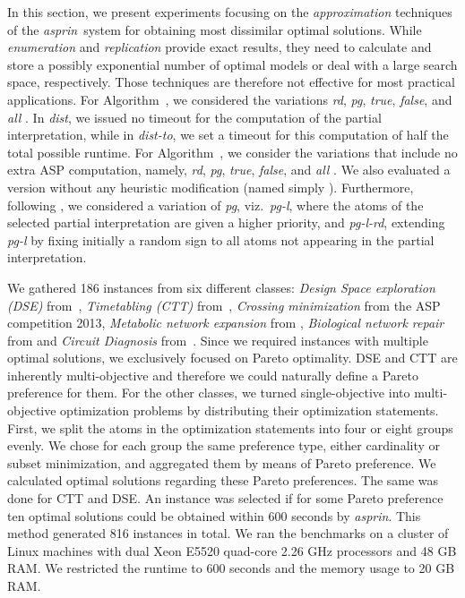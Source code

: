 \documentclass[a4paper,USenglish]{oasics-v2016}
\newcommand{\sysfont}{\textit}
\newcommand{\asprin}{\sysfont{asprin}}
\newcommand{\Alabel}[1]{\textcolor{darkgray}{\small\sffamily\bfseries\mathversion{bold}{A-#1}}}
\begin{document}
%
In this section, we present experiments focusing on the \emph{approximation} techniques of the \asprin\ system for obtaining most dissimilar optimal
solutions. 
%
While \emph{enumeration} and \emph{replication} provide exact results, they need to calculate and store a possibly exponential number of optimal
models or deal with a large search space, respectively.
%
Those techniques are therefore not effective for most practical applications.
%
For Algorithm~\Alabel{2}, we considered the variations \textit{rd}, \textit{pg}, \textit{true}, \textit{false}, and \textit{all} .
%
In \textit{dist}, we issued no timeout for the computation of the partial interpretation, 
while in \textit{dist-to}, we set a timeout for this computation of half the total possible runtime.
%
For Algorithm~\Alabel{3}, we consider the variations that include no extra ASP computation, namely, 
\textit{rd}, \textit{pg}, \textit{true}, \textit{false}, and \textit{all} .
%
We also evaluated a version without any heuristic modification (named simply \Alabel{3}).
%
Furthermore, following \cite{nadel11a}, 
we considered a variation of \textit{pg}, viz.~\textit{pg-l}, 
where the atoms of the selected partial interpretation are given a higher priority, 
and \textit{pg-l-rd}, extending \textit{pg-l} by fixing initially a random sign to all atoms not appearing in the partial interpretation.

We gathered 186 instances from six different classes: \emph{Design Space exploration (DSE)} from~\cite{angeglharesc13a}, \emph{Timetabling (CTT)}
from~\cite{basotainsc13a}, \emph{Crossing minimization} from the ASP competition 2013, \emph{Metabolic network expansion} from \cite{schthi09a},
\emph{Biological network repair} from \cite{geguivscsithve10a} and \emph{Circuit Diagnosis} from~\cite{sidiqqi11a}.
Since we required instances with multiple optimal solutions, we exclusively focused on Pareto optimality. 
DSE and CTT are inherently multi-objective and therefore we could naturally define a Pareto preference for them. 
For the other classes, we turned single-objective into multi-objective optimization problems by distributing their optimization statements.
First, we split the atoms in the optimization statements into four or eight groups evenly. 
We chose for each group the same preference type, either cardinality or subset minimization, and aggregated them by means of Pareto preference.
We calculated optimal solutions regarding these Pareto preferences.
The same was done for CTT and DSE.
An instance was selected if for some Pareto preference ten optimal solutions could be obtained within 600 seconds by \asprin. 
This method generated 816 instances in total. 
We ran the benchmarks on a cluster of Linux machines with dual Xeon E5520 quad-core 2.26 GHz processors and 48 GB RAM. 
We restricted the runtime to 600 seconds and the memory usage to 20 GB RAM.
\end{document}
